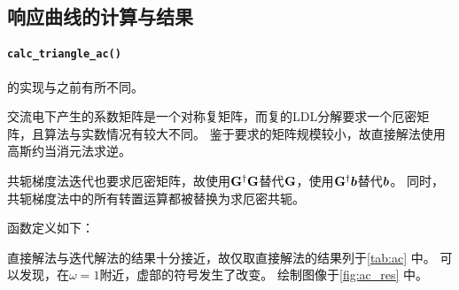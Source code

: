 \subsection{响应曲线的计算与结果}
\paragraph{\texttt{calc\_triangle\_ac()}}
的实现与之前有所不同。

交流电下产生的系数矩阵是一个对称复矩阵，而复的LDL分解要求一个厄密矩阵，且算法与实数情况有较大不同。
鉴于要求的矩阵规模较小，故直接解法使用高斯约当消元法求逆。

共轭梯度法迭代也要求厄密矩阵，故使用$\vb{G}^\dagger\vb{G}$替代$\vb{G}$，使用$\vb{G}^\dagger\vb*{b}$替代$\vb*{b}$。
同时，共轭梯度法中的所有转置运算都被替换为求厄密共轭。

函数定义如下：
{
    \linespread{1.0}
    
}

直接解法与迭代解法的结果十分接近，故仅取直接解法的结果列于\autoref{tab:ac} 中。
可以发现，在$\omega=1$附近，虚部的符号发生了改变。
绘制图像于\autoref{fig:ac_res} 中。

